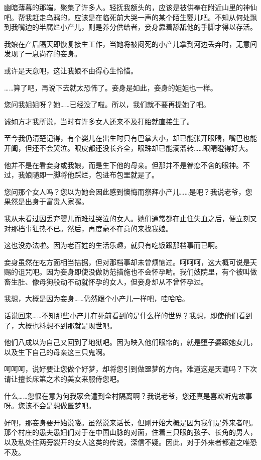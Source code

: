 \documentclass[portrait,a4paper]{article}
\begin{document}
幽暗薄暮的那端，聚集了许多人。轻抚我额头的，应该是被供奉在附近山里的神仙吧。帮我赶走乌鸦的，应该是在临死前大哭一声的某个陌生婴儿吧。不知从何处飘到我嘴边的半腐烂小产儿，则是养分供给者，妾身靠着舔舐他的手脚才得以存活。

我娘在产后隔天即恢复接生工作，当她将被闷死的小产儿拿到河边丢弃时，无意间发现了一息尚存的妾身。

或许是天意吧，这让我娘不由得心生怜惜。

……算了吧，再说下去就太恐怖了。妾身是如此，妾身的姐姐也一样。

您问我姐姐呀？她……已经没了啦。所以，我们就不要再提她了吧。

诚如方才我所说，当时有许多女人还来不及打胎就直接生了。

至今我仍清楚记得，有个婴儿在出生时只有巴掌大小，却已能张开眼睛，嘴巴也能开阖，但还不会哭泣。眼皮都还没长齐全，眼珠却已能滴溜转……眼睛瞪得好大。

他并不是在看妾身或我娘，而是生下他的母亲。但那并不是眷恋不舍的眼神。不过，我娘随即一脚将他踩烂，包进布包里就是了。

您问那个女人吗？您以为她会因此感到懊悔而祭拜小产儿……是吧？我说老爷，您果然是出身于富贵人家喔。

我从未看过因丢弃婴儿而难过哭泣的女人。她们通常都在止住失血之后，便立刻又对那档事狂热不已。然后，再度毫不在意的来找我娘。

这也没办法啦。因为老百姓的生活乐趣，就只有吃饭跟那档事而已啊。

妾身虽然在吃方面相当拮据，但对那档事却未曾烦恼过。呵呵呵，这大概可说是天赐的诅咒吧。因为妾身即使没做防范措施也不会怀孕哟。我们妓院里，有个被叫做畜生肚、像母狗般动不动就怀孕的女人，但妾身却从不曾怀孕过。

我想，大概是因为妾身……仍然跟个小产儿一样吧，哇哈哈。

话说回来……不知那些小产儿在死前看到的是什么样的世界？我想，即使他们看到了，大概也料想不到那就是现世吧。

他们八成以为自己又回到了地狱吧。因为映入他们眼帘的，就是堕子婆跟她女儿，以及生下自己的母亲这三只鬼啊。

呵呵呵，说好要让您做个好梦，却将您引到做噩梦的方向。难道这是天谴吗？下次请让擅长床第之术的美女来服侍您吧。

什么……您很在意为何我家会遭到全村隔离啊？我说老爷，您还真是喜欢听鬼故事呀。您该不会是想做噩梦吧。

好吧，那妾身要开始说喽。虽然说来话长，但刚开始大概是因为我们是外来者吧。那个村庄的愚夫愚妇们对于在中国山脉的对面，住着三只眼的孩子、长角的男人，以及私处往两旁裂开的女人这类的传说，深信不疑。因此，对于外来者都避之唯恐不及。
\end{document}
